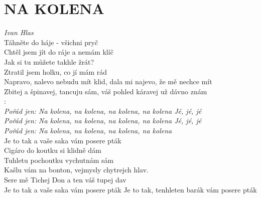 \section*{\Huge NA KOLENA}
\emph{Ivan Hlas}\\

Táhněte do háje - všichni pryč\\
Chtěl jsem jít do ráje a nemám klíč\\
Jak si tu můžete takhle žrát?\\
Ztratil jsem holku, co jí mám rád\\
 
Napravo, nalevo nebudu mít klid, dala mi najevo, že mě nechce mít\\
Zbitej a špinavej, tancuju sám, váš pohled káravej už dávno znám\\
 
\textregistered:\\
\emph{Pořád jen: Na kolena, na kolena, na kolena, na kolena Jé, jé, jé\\
Pořád jen: Na kolena, na kolena, na kolena, na kolena Jé, jé, jé\\
Pořád jen: Na kolena, na kolena, na kolena, na kolena}\\
Je to tak a vaše saka vám posere pták\\
 
Cigáro do koutku si klidně dám\\
Tuhletu pochoutku vychutnám sám\\
Kašlu vám na bonton, vejmysly chytrejch hlav.\\
Sere mě Tichej Don a ten váš tupej dav\\
 
\textregistered Je to tak a vaše saka vám posere pták
\textregistered Je to tak, tenhleten barák vám posere pták 

\newpage

